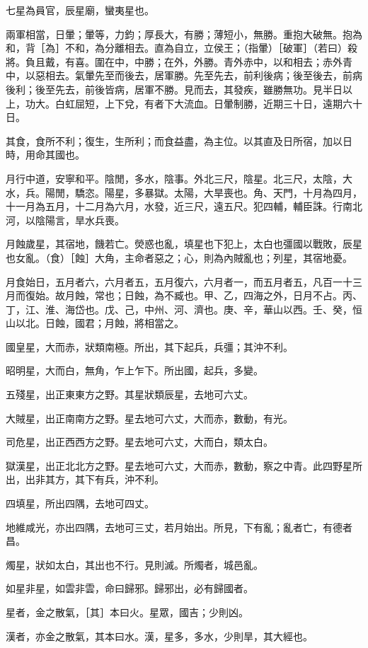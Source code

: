 \documentclass[10pt,fontset=adobe,UTF8,twoside]{ctexrep}
\begin{document}
七星為員官，辰星廟，蠻夷星也。

兩軍相當，日暈；暈等，力鈞；厚長大，有勝；薄短小，無勝。重抱大破無。抱為和，背［為］不和，為分離相去。直為自立，立侯王；（指暈）［破軍］（若曰）殺將。負且戴，有喜。圍在中，中勝；在外，外勝。青外赤中，以和相去；赤外青中，以惡相去。氣暈先至而後去，居軍勝。先至先去，前利後病；後至後去，前病後利；後至先去，前後皆病，居軍不勝。見而去，其發疾，雖勝無功。見半日以上，功大。白虹屈短，上下兌，有者下大流血。日暈制勝，近期三十日，遠期六十日。

其食，食所不利；復生，生所利；而食益盡，為主位。以其直及日所宿，加以日時，用命其國也。

月行中道，安寧和平。陰閒，多水，陰事。外北三尺，陰星。北三尺，太陰，大水，兵。陽閒，驕恣。陽星，多暴獄。太陽，大旱喪也。角、天門，十月為四月，十一月為五月，十二月為六月，水發，近三尺，遠五尺。犯四輔，輔臣誅。行南北河，以陰陽言，旱水兵喪。

月蝕歲星，其宿地，饑若亡。熒惑也亂，填星也下犯上，太白也彊國以戰敗，辰星也女亂。（食）［蝕］大角，主命者惡之；心，則為內賊亂也；列星，其宿地憂。

月食始日，五月者六，六月者五，五月復六，六月者一，而五月者五，凡百一十三月而復始。故月蝕，常也；日蝕，為不臧也。甲、乙，四海之外，日月不占。丙、丁，江、淮、海岱也。戊、己，中州、河、濟也。庚、辛，華山以西。壬、癸，恒山以北。日蝕，國君；月蝕，將相當之。

國皇星，大而赤，狀類南極。所出，其下起兵，兵彊；其沖不利。

昭明星，大而白，無角，乍上乍下。所出國，起兵，多變。

五殘星，出正東東方之野。其星狀類辰星，去地可六丈。

大賊星，出正南南方之野。星去地可六丈，大而赤，數動，有光。

司危星，出正西西方之野。星去地可六丈，大而白，類太白。

獄漢星，出正北北方之野。星去地可六丈，大而赤，數動，察之中青。此四野星所出，出非其方，其下有兵，沖不利。

四填星，所出四隅，去地可四丈。

地維咸光，亦出四隅，去地可三丈，若月始出。所見，下有亂；亂者亡，有德者昌。

燭星，狀如太白，其出也不行。見則滅。所燭者，城邑亂。

如星非星，如雲非雲，命曰歸邪。歸邪出，必有歸國者。

星者，金之散氣，［其］本曰火。星眾，國吉；少則凶。

漢者，亦金之散氣，其本曰水。漢，星多，多水，少則旱，其大經也。
\end{document}

